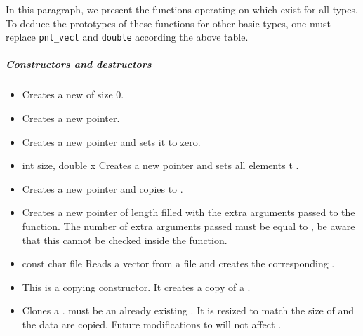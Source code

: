 In this paragraph, we present the functions operating on 
which exist for all types. To deduce the prototypes of these functions for
other basic types, one must replace {\tt pnl_vect} and {\tt double} according
the above table. 
\subparagraph{Constructors and destructors}
\begin{itemize}
  \item {}
  \sshortdescribe Creates a new  of size 0.  
\item {}
  \sshortdescribe Creates a new  pointer.  
\item {}
  \sshortdescribe Creates a new  pointer and sets it to zero.  
\item {}
  {int size, double x}
  \sshortdescribe Creates a new  pointer and sets all
  elements t .  
\item {}
  \sshortdescribe Creates a new  pointer and copies 
  to .  
\item {}
  \sshortdescribe Creates a new  pointer of length
   filled with the extra arguments passed to the function. The
  number of extra arguments passed must be equal to , be aware that
  this cannot be checked inside the function.
\item {}
  {const char \ptr file}
  \sshortdescribe Reads a vector from a file and creates the corresponding
  .  

\item {}
  \sshortdescribe This is a copying constructor. It creates a copy of a .
\item {} 
  \sshortdescribe Clones a .  must be an
  already existing  . It is resized to match the size of
   and the data are copied. Future modifications to  will not
  affect .


\end{itemize}
